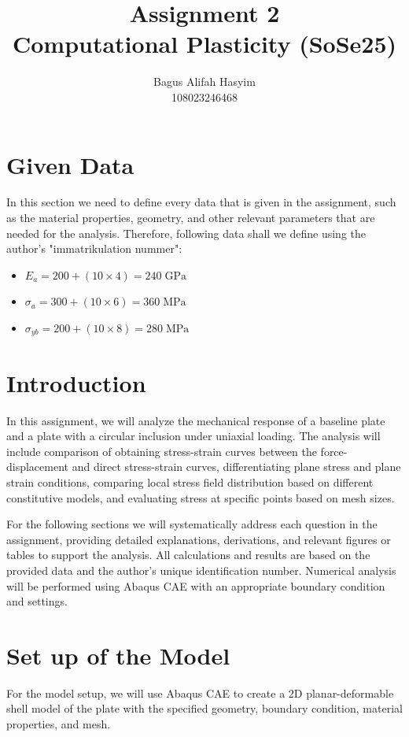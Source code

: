 \documentclass[12pt]{article}
\title{Assignment 2 \\ \large Computational Plasticity (SoSe25)}
\author{Bagus Alifah Hasyim \\ 108023246468}
\date{}
\begin{document}
\maketitle

\section*{Given Data}
\hspace*{2em}In this section we need to define every data that is given in the assignment, such as the material properties, geometry, 
and other relevant parameters that are needed for the analysis. Therefore, following data shall we define using the author's "immatrikulation nummer":

\begin{itemize}
    \item $E_a = 200 + (10 \times 4) = 240 \;\text{GPa}$  
    \item $\sigma_a = 300 + (10 \times 6) = 360 \;\text{MPa}$
    \item $\sigma_{yb} = 200 + (10 \times 8) = 280 \;\text{MPa}$
\end{itemize}

\section{Introduction}
\hspace*{2em}In this assignment, we will analyze the mechanical response of a baseline plate
and a plate with a circular inclusion under uniaxial loading. 
The analysis will include comparison of obtaining stress-strain curves between the force-displacement and
direct stress-strain curves, differentiating plane stress and plane strain conditions, comparing 
local stress field distribution based on different constitutive models, and evaluating stress at specific points based on mesh sizes.

\hspace*{2em}For the following sections we will systematically address each question in the assignment, 
providing detailed explanations, derivations, and relevant figures or tables to 
support the analysis. 
All calculations and results are based on the provided data and the author's unique 
identification number. Numerical analysis will be performed using Abaqus CAE with an appropriate
boundary condition and settings. 


\section{Set up of the Model}
\hspace*{2em}For the model setup, we will use Abaqus CAE to create a 2D planar-deformable shell model of the plate with the specified geometry, boundary condition, material properties, and mesh.  
\end{document}
